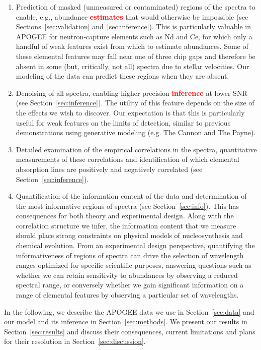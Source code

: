 \documentclass[a4paper,fleqn,usenatbib]{mnras}
\newcommand\edit[1]{\textcolor{red}{\textbf{#1}}}
\begin{document}
\begin{enumerate}
\item Prediction of masked (unmeasured or contaminated) regions of the spectra to enable, e.g., abundance \edit{estimates} that would otherwise be impossible (see Sections~\ref{sec:validation} and~\ref{sec:inference}). This is particularly valuable in APOGEE for neutron-capture elements such as Nd and Ce, for which only a handful of weak features exist from which to estimate abundances. Some of these elemental features may fall near one of three chip gaps and therefore be absent in some (but, critically, not all) spectra due to stellar velocities. Our modeling of the data can predict these regions when they are absent. 
\item Denoising of all spectra, enabling higher precision \edit{inference} at lower SNR (see Section~\ref{sec:inference}). The utility of this feature depends on the size of the effects we wish to discover. Our expectation is that this is particularly useful for weak features on the limits of detection, similar to previous demonstrations using generative modeling (e.g. The Cannon and The Payne).
\item Detailed examination of the empirical correlations in the spectra, quantitative measurements of these correlations and identification of which elemental absorption lines are positively and negatively correlated (see Section~\ref{sec:inference}).
\item Quantification of the information content of the data and determination of the most informative regions of spectra (see Section~\ref{sec:info}). This has consequences for both theory and experimental design. Along with the correlation structure we infer, the information content that we measure should place strong constraints on physical models of nucleosynthesis and chemical evolution. From an experimental design perspective, quantifying the informativeness of regions of spectra can drive the selection of wavelength ranges optimized for specific scientific purposes, answering questions such as whether we can retain sensitivity to abundances by observing a reduced spectral range, or conversely whether we gain significant information on a range of elemental features by observing a particular set of wavelengths.
\end{enumerate}

In the following, we describe the APOGEE data we use in Section~\ref{sec:data} and our model and its inference in Section~\ref{sec:methods}. We present our results in Section~\ref{sec:results} and discuss their consequences, current limitations and plans for their resolution in Section~\ref{sec:discussion}.
\end{document}
